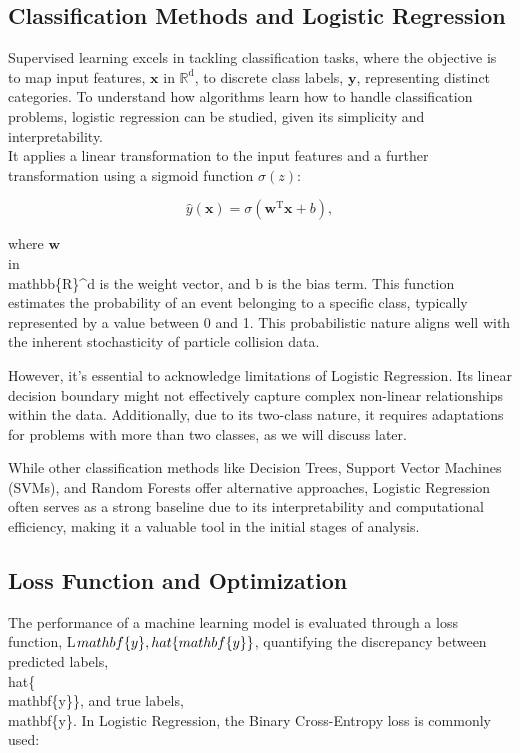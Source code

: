 \subsection{Classification Methods and Logistic Regression}

Supervised learning excels in tackling classification tasks, where the objective is to map input features, $\mathbf x$ in $\mathbb{R}^\mathrm{d}$, to discrete class labels, $\mathbf{y}$, representing distinct categories. To understand how algorithms learn how to handle classification problems, logistic regression can be studied, given its simplicity and interpretability. \\
It applies a linear transformation to the input features and a further transformation using a sigmoid function $\sigma(z)$:

\begin{equation}
\hat{y}(\mathbf{x}) = \sigma(\mathbf{w}^\mathrm{T} \mathbf{x} + b),
\end{equation}

where $\mathbf{w}$ \\in \\mathbb\{R\}^d is the weight vector, and b is the bias term. This function estimates the probability of an event belonging to a specific class, typically represented by a value between 0 and 1. This probabilistic nature aligns well with the inherent stochasticity of particle collision data.

However, it's essential to acknowledge limitations of Logistic Regression. Its linear decision boundary might not effectively capture complex non-linear relationships within the data. Additionally, due to its two-class nature, it requires adaptations for problems with more than two classes, as we will discuss later.

While other classification methods like Decision Trees, Support Vector Machines (SVMs), and Random Forests offer alternative approaches, Logistic Regression often serves as a strong baseline due to its interpretability and computational efficiency, making it a valuable tool in the initial stages of analysis.

\subsection{Loss Function and Optimization}

The performance of a machine learning model is evaluated through a loss function, L\(\\mathbf\{y\}, \\hat\{\\mathbf\{y\}\}\), quantifying the discrepancy between predicted labels, \\hat\{\\mathbf\{y\}\}, and true labels, \\mathbf\{y\}. In Logistic Regression, the Binary Cross-Entropy loss is commonly used:

